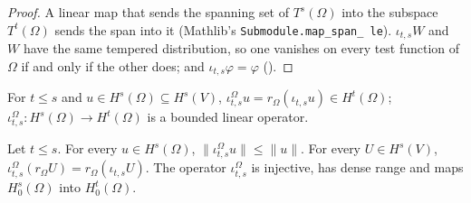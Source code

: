 \begin{proof}
\leanok
A linear map that sends the spanning set of $T^s(\Omega)$ into the subspace $T^t(\Omega)$ sends
the span into it (Mathlib's \texttt{Submodule.\allowbreak map\_\allowbreak span\_\allowbreak
le}). $\iota_{t,s} W$ and $W$ have the same tempered distribution, so one vanishes on every test
function of $\Omega$ if and only if the other does; and $\iota_{t,s} \varphi = \varphi$
().
\end{proof}

\begin{definition}
\label{def:restriction-inclusion}
\leanok
{}
For $t \leq s$ and $u \in H^s(\Omega) \subseteq H^s(V)$, $\iota^\Omega_{t,s} u =
r_\Omega(\iota_{t,s} u) \in H^t(\Omega)$; $\iota^\Omega_{t,s} : H^s(\Omega) \to H^t(\Omega)$ is a
bounded linear operator.
\end{definition}

\begin{lemma}
\label{lem:restriction-inclusion}
\leanok
{}
Let $t \leq s$. For every $u \in H^s(\Omega)$, $\|\iota^\Omega_{t,s} u\| \leq \|u\|$. For every
$U \in H^s(V)$, $\iota^\Omega_{t,s}(r_\Omega U) = r_\Omega(\iota_{t,s} U)$. The operator
$\iota^\Omega_{t,s}$ is injective, has dense range and maps $H^s_0(\Omega)$ into
$H^t_0(\Omega)$.
\end{lemma}


